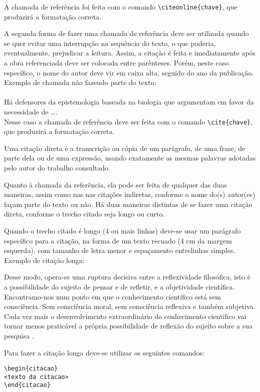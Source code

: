 A chamada de referência foi feita com o comando \verb|\citeonline{chave}|, que produzirá a formatação correta.

A segunda forma de fazer uma chamada de referência deve ser utilizada quando se quer evitar uma interrupção na sequência do texto, o que poderia, eventualmente, prejudicar a leitura. Assim, a citação é feita e imediatamente após a obra referenciada deve ser colocada entre parênteses. Porém, neste caso específico, o nome do autor deve vir em caixa alta, seguido do ano da publicação. Exemplo de chamada não fazendo parte do texto:\\
\\Há defensores da epistemologia baseada na biologia que argumentam em favor da necessidade de \ldots \cite{Maturana2003}.\\

Nesse caso a chamada de referência deve ser feita com o comando \verb|\cite{chave}|, que produzirá a formatação correta.

Uma citação direta é a transcrição ou cópia de um parágrafo, de uma frase, de parte dela ou de uma expressão, usando exatamente as mesmas palavras adotadas pelo autor do trabalho consultado.

Quanto à chamada da referência, ela pode ser feita de qualquer das duas maneiras, assim como nas nas citações indiretas, conforme o nome do(s) autor(es) façam parte do texto ou não. Há duas maneiras distintas de se fazer uma citação direta, conforme o trecho citado seja longo ou curto.

Quando o trecho citado é longo (4 ou mais linhas) deve-se usar um parágrafo específico para a citação, na forma de um texto recuado (4 cm da margem esquerda), com tamanho de letra menor e espaçamento entrelinhas simples. Exemplo de citação longa:
\\\begin{citacao}
Desse modo, opera-se uma ruptura decisiva entre a reflexividade filosófica, isto é a possibilidade do sujeito de pensar e de refletir, e a objetividade científica. Encontramo-nos num ponto em que o conhecimento científico está sem consciência. Sem consciência moral, sem consciência reflexiva e também subjetiva. Cada vez mais o desenvolvimento extraordinário do conhecimento científico vai tornar menos praticável a própria possibilidade de reflexão do sujeito sobre a sua pesquisa \cite[p.~28]{Silva2000}.
\end{citacao}

Para fazer a citação longa deve-se utilizar os seguintes comandos:
\begin{verbatim}
\begin{citacao}
<texto da citacao>
\end{citacao}
\end{verbatim}

